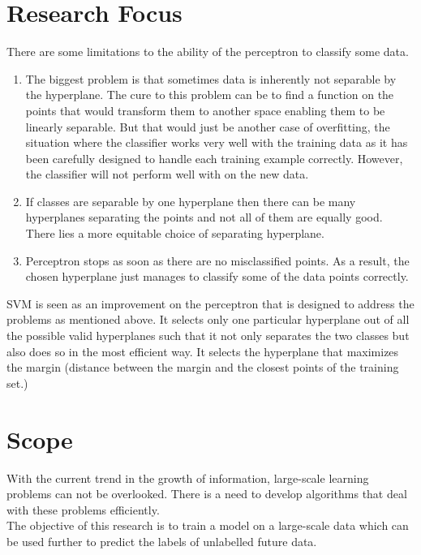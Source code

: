 \documentclass{article}
\begin{document}
\section{Research Focus}
There are some limitations to the ability of the perceptron to classify some data.
\begin{enumerate}
    \item The biggest problem is that sometimes data is inherently not separable by the hyperplane. The cure to this problem can be to find a function on the points that would transform them to another space enabling them to be linearly separable. But that would just be another case of overfitting, the situation where the classifier works very well with the training data as it has been carefully designed to handle each training example correctly. However, the classifier will not perform well with on the new data.
\item If classes are separable by one hyperplane then there can be many hyperplanes separating the points and not all of them are equally good. There lies a more equitable choice of separating hyperplane.
\item Perceptron stops as soon as there are no misclassified points. As a result, the chosen hyperplane just manages to classify some of the data points correctly.
\end{enumerate}
SVM is seen as an improvement on the perceptron that is designed to address the problems as mentioned above. It selects only one particular hyperplane out of all the possible valid hyperplanes such that it not only separates the two classes but also does so in the most efficient way. It selects the hyperplane that maximizes the margin (distance between the margin and the closest points of the training set.)


\section{Scope}
With the current trend in the growth of information, large-scale learning problems can not be overlooked. There is a need to develop algorithms that deal with these problems efficiently.\\
The objective of this research is to train a model on a large-scale data which can be used further to predict the labels of unlabelled future data.



\nocite{winnow,wikiedits,carlson1999snow,menon2009large,book,Joachims:1999:MLS:299094.299104,ibm}


\end{document}
